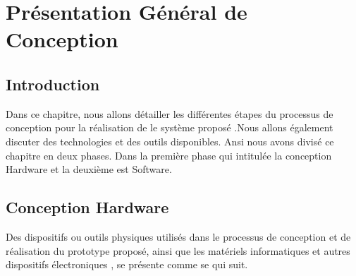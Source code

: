 \chapter{Présentation Général de Conception} \label{chap:Présentation Général de Conception}
\section{Introduction}
Dans ce chapitre, nous allons détailler les différentes étapes du processus de conception pour la réalisation de le système proposé .Nous allons également discuter des technologies et des outils disponibles. Ansi nous avons divisé ce chapitre en deux phases. Dans la première phase qui intitulée la conception Hardware et la deuxième est Software.
\section{Conception Hardware}
Des dispositifs ou outils physiques utilisés dans le processus de conception et de réalisation du prototype proposé, ainsi que les matériels informatiques et autres dispositifs électroniques , se présente comme se qui suit.

